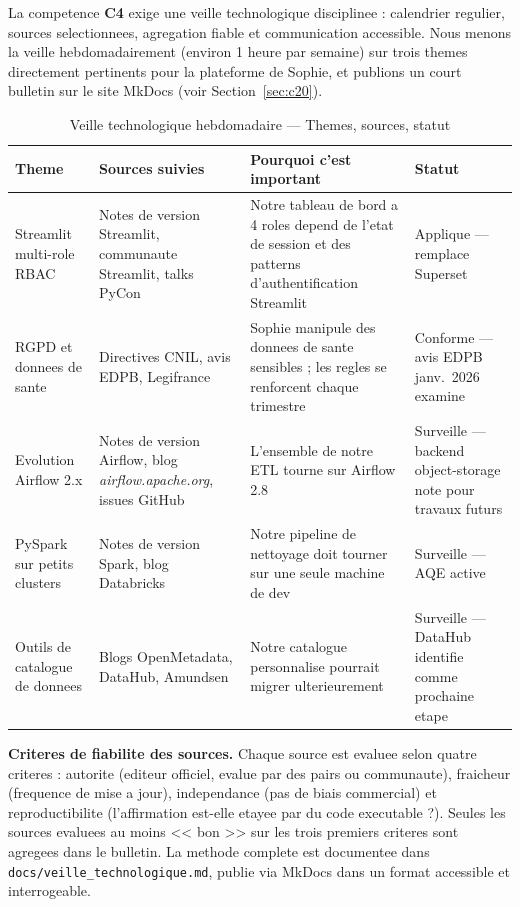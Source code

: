 \documentclass[a4paper,11pt,oneside,openany]{report}
\newcommand{\competence}[1]{\textbf{\textcolor{ntgreen}{#1}}}
\newcommand{\rgpd}{RGPD}
\begin{document}
La competence \competence{C4} exige une veille technologique
disciplinee : calendrier regulier, sources selectionnees, agregation
fiable et communication accessible. Nous menons la veille
hebdomadairement (environ 1 heure par semaine) sur trois themes
directement pertinents pour la plateforme de Sophie, et publions un
court bulletin sur le site MkDocs (voir Section~\ref{sec:c20}).

\begin{table}[H]
\centering
\caption{Veille technologique hebdomadaire --- Themes, sources, statut}
\label{tab:veille}
\begin{tabularx}{\textwidth}{L{3cm} L{4cm} L{4cm} L{2.5cm}}
\toprule
\textbf{Theme} & \textbf{Sources suivies} & \textbf{Pourquoi c'est important} & \textbf{Statut} \\
\midrule
Streamlit multi-role RBAC & Notes de version Streamlit, communaute Streamlit, talks PyCon & Notre tableau de bord a 4 roles depend de l'etat de session et des patterns d'authentification Streamlit & Applique --- remplace Superset \\
\rgpd{} et donnees de sante & Directives CNIL, avis EDPB, Legifrance & Sophie manipule des donnees de sante sensibles ; les regles se renforcent chaque trimestre & Conforme --- avis EDPB janv.\ 2026 examine \\
Evolution Airflow 2.x & Notes de version Airflow, blog \textit{airflow.apache.org}, issues GitHub & L'ensemble de notre ETL tourne sur Airflow 2.8 & Surveille --- backend object-storage note pour travaux futurs \\
PySpark sur petits clusters & Notes de version Spark, blog Databricks & Notre pipeline de nettoyage doit tourner sur une seule machine de dev & Surveille --- AQE active \\
Outils de catalogue de donnees & Blogs OpenMetadata, DataHub, Amundsen & Notre catalogue personnalise pourrait migrer ulterieurement & Surveille --- DataHub identifie comme prochaine etape \\
\bottomrule
\end{tabularx}
\end{table}

\textbf{Criteres de fiabilite des sources.} Chaque source est evaluee
selon quatre criteres : autorite (editeur officiel, evalue par des
pairs ou communaute), fraicheur (frequence de mise a jour),
independance (pas de biais commercial) et reproductibilite
(l'affirmation est-elle etayee par du code executable ?). Seules les
sources evaluees au moins << bon >> sur les trois premiers criteres
sont agregees dans le bulletin. La methode complete est documentee
dans \texttt{docs/veille\_technologique.md}, publie via MkDocs dans
un format accessible et interrogeable.
\end{document}
